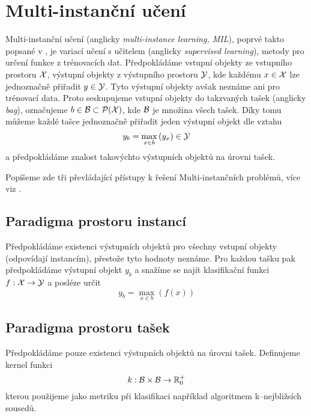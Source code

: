 \chapter{Multi-instanční učení}
Multi-instanční učení (anglicky \textenglish{\textit{multi-instance learning, MIL}}), poprvé takto popsané v \cite{dietterich_solving_1997}, je variací učení s učitelem (anglicky \textenglish{\textit{supervised learning}}), metody pro určení funkce z trénovacích dat. Předpokládáme vstupní objekty ze vstupního prostoru \( \mathcal X \), výstupní objekty z výstupního prostoru \( \mathcal Y \), kde každému \( x \in \mathcal X \) lze jednoznačně přiřadit \( y \in \mathcal Y \). Tyto výstupní objekty avšak neznáme ani pro trénovací data. Proto seskupujeme vstupní objekty do takzvaných tašek (anglicky \textenglish{\textit{bag}}), označujeme \( b \in \mathcal B \subset \mathcal P ( \mathcal X ) \), kde \( \mathcal B \) je množina všech tašek. Díky tomu můžeme každé tašce jednoznačně přiřadit jeden výstupní objekt dle vztahu
\begin{equation}\label{baglabel}
	y_b = \max_{x \in b} \left( y_x \right) \in \mathcal Y
\end{equation}
a předpokládáme znalost takovýchto výstupních objektů na úrovni tašek. 

Popíšeme zde tři převládající přístupy k řešení Multi-instančních problémů, více viz \cite{pevny_using_2016}.

\section{Paradigma prostoru instancí}
Předpokládáme existenci výstupních objektů pro všechny vstupní objekty (odpovídají instancím), přestože tyto hodnoty neznáme. Pro každou tašku pak předpokládáme výstupní objekt \( y_b \) a snažíme se najít klasifikační funkci \( f : \mathcal X \to \mathcal Y \) a posléze určit
\begin{equation}
	y_b = \max_{x \in b} \left( f \left( x \right) \right)
\end{equation}

\section{Paradigma prostoru tašek}
Předpokládáme pouze existenci výstupních objektů na úrovni tašek. Definujeme kernel funkci
\begin{equation}
	k : \mathcal B \times \mathcal B \to \mathbb R_0^+
\end{equation}
kterou použijeme jako metriku při klasifikaci například algoritmem k--nejbližsích sousedů.

